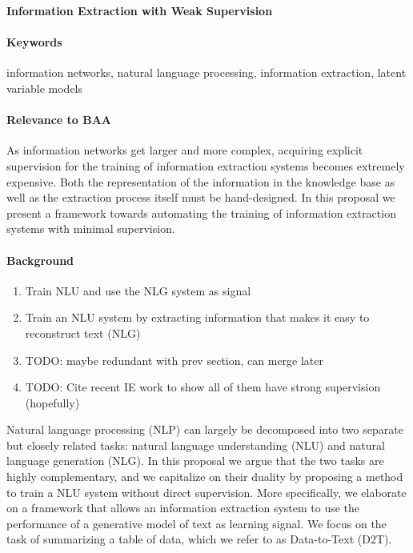 \documentclass[11pt]{article}
\begin{document}

\begin{center}
\textbf{Information Extraction with Weak Supervision}
\end{center}

\begin{comment}
Spectrum from hard attention => hard segmental => HSMM for generative model, coverage / recall
Should we go into HSMM??? or is hard segmental attention enough

composition function = categorical over two entries of x

structured attention for IE posterior?
\end{comment}

\paragraph{Keywords}
information networks, natural language processing, information extraction,
latent variable models

\paragraph{Relevance to BAA}
As information networks get larger and more complex,
acquiring explicit supervision for the training of information extraction systems
becomes extremely expensive.
Both the representation of the information in the knowledge base
as well as the extraction process itself must be hand-designed.
In this proposal we present a framework towards automating the
training of information extraction systems with minimal supervision.

\paragraph{Background}
\begin{enumerate}
\item Train NLU and use the NLG system as signal
\item Train an NLU system by extracting information that makes it 
easy to reconstruct text (NLG)
\item TODO: maybe redundant with prev section, can merge later
\item TODO: Cite recent IE work to show all of them have strong supervision (hopefully)
\end{enumerate}
Natural language processing (NLP) can largely be decomposed into two separate but
closely related tasks: natural language understanding (NLU) and natural language
generation (NLG).
In this proposal we argue that the two tasks are highly complementary,
and we capitalize on their duality by proposing a method to train a NLU system
without direct supervision.
More specifically, we elaborate on a framework that allows an information
extraction system to use the performance of a generative model of text as learning signal.
We focus on the task of summarizing a table of data,
which we refer to as Data-to-Text (D2T).
\end{document}
